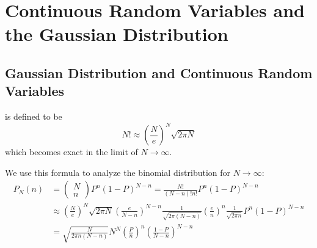 \documentclass[12pt, a4paper, oneside, openright, titlepage]{book}
\begin{document}
\chapter{Continuous Random Variables and the Gaussian Distribution}

\section{Gaussian Distribution and Continuous Random Variables}

\begin{defn}
     is defined to be \begin{equation*}
        N! \approx \left(\frac{N}{e}\right)^N\sqrt{2\pi N}
    \end{equation*}
    which becomes exact in the limit of $N\rightarrow \infty$.
\end{defn}
We use this formula to analyze the binomial distribution for $N\rightarrow \infty$: \begin{align*}
    P_N(n) &= \begin{pmatrix} N \\ n\end{pmatrix} P^n(1-P)^{N-n} = \frac{N!}{(N-n)!n!}P^n(1-P)^{N-n} \\
        &\approx \left(\frac{N}{e}\right)^N\sqrt{2\pi N}\left(\frac{e}{N-n}\right)^{N-n}\frac{1}{\sqrt{2\pi(N-n)}}\left(\frac{e}{n}\right)^n\frac{1}{\sqrt{2\pi n}}P^n(1-P)^{N-n} \\
        &= \sqrt{\frac{N}{2\pi n(N-n)}}N^N\left(\frac{P}{n}\right)^n\left(\frac{1-P}{N-n}\right)^{N-n}
\end{align*}
\end{document}
